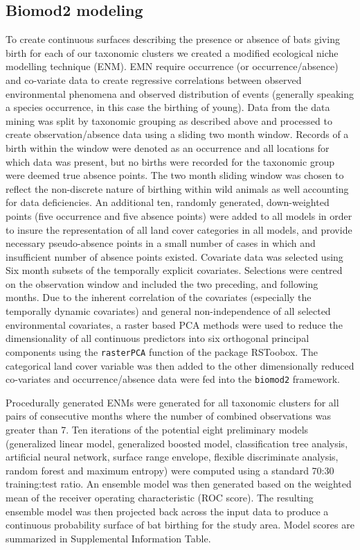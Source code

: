 \documentclass[9pt,twoside,lineno]{pnas-new}
\begin{document}
\subsection*{Biomod2 modeling}
\label{biomod}

To create continuous surfaces describing the presence or absence of bats giving birth for each of our taxonomic clusters we created a modified ecological niche modelling technique (ENM).
EMN require occurrence (or occurrence/absence) and co-variate data to create regressive correlations between observed environmental phenomena and observed distribution of events (generally speaking a species occurrence, in this case the birthing of young).
Data from the data mining was split by taxonomic grouping as described above and processed to create observation/absence data using a sliding two month window.
Records of a birth within the window were denoted as an occurrence and all locations for which data was present, but no births were recorded for the taxonomic group were deemed true absence points. 
The two month sliding window was chosen to reflect the non-discrete nature of birthing within wild animals as well accounting for data deficiencies.
An additional ten, randomly generated, down-weighted points (five occurrence and five absence points) were added to all models in order to insure the representation of all land cover categories in all models, and provide necessary pseudo-absence points in a small number of cases in which and insufficient number of absence points existed.
Covariate data was selected using Six month subsets of the temporally explicit covariates.
Selections were centred on the observation window and included the two preceding, and following months.
Due to the inherent correlation of the covariates (especially the temporally dynamic covariates) and general non-independence of all selected environmental covariates, a raster based PCA methods were used to reduce the dimensionality of all continuous predictors into six orthogonal principal components using the \texttt{rasterPCA} function of the package RSToobox.
The categorical land cover variable was then added to the other dimensionally reduced co-variates and occurrence/absence data were fed into the \texttt{biomod2} framework.\par

Procedurally generated ENMs were generated for all taxonomic clusters for all pairs of consecutive months where the number of combined observations was greater than 7.
Ten iterations of the potential eight preliminary models (generalized linear model, generalized boosted model, classification tree analysis, artificial neural network, surface range envelope, flexible discriminate analysis, random forest and maximum entropy) were computed using a standard 70:30 training:test ratio.
An ensemble model was then generated based on the weighted mean of the receiver operating characteristic (ROC score).
The resulting ensemble model was then projected back across the input data to produce a continuous probability surface of bat birthing for the study area. 
Model scores are summarized in Supplemental Information Table.\par
\end{document}
